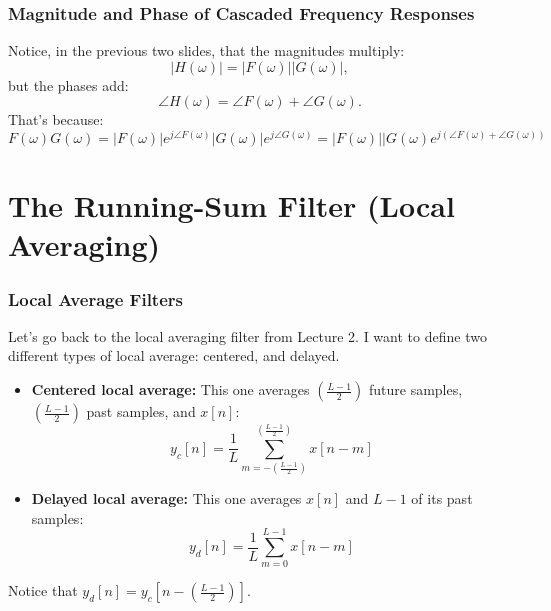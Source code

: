 \documentclass{beamer}
\begin{document}
\begin{frame}
  \frametitle{Magnitude and Phase of Cascaded Frequency Responses}

  Notice, in the previous two slides, that the magnitudes multiply:
  \[
  |H(\omega)|=|F(\omega)||G(\omega)|,
  \]
  but the phases add:
  \[
  \angle H(\omega) = \angle F(\omega)+\angle G(\omega).
  \]
  That's because:
  \[
  F(\omega)G(\omega)=|F(\omega)|e^{j\angle F(\omega)}|G(\omega)|e^{j\angle G(\omega)}
  =|F(\omega)||G(\omega) e^{j\left(\angle F(\omega)+\angle G(\omega)\right)}
  \]
\end{frame}

\section[Sum]{The Running-Sum Filter (Local Averaging)}
\setcounter{subsection}{1}

\begin{frame}
  \frametitle{Local Average Filters}

  Let's go back to the local averaging filter from Lecture 2. I want to define two 
  different types of local average: centered, and delayed.
  \begin{itemize}
  \item {\bf Centered local average:} This one averages
    $\left(\frac{L-1}{2}\right)$ future samples,
    $\left(\frac{L-1}{2}\right)$ past samples, and $x[n]$:
    \[
    y_c[n] = \frac{1}{L}\sum_{m=-\left(\frac{L-1}{2}\right)}^{\left(\frac{L-1}{2}\right)} x[n-m]
    \]
  \item {\bf Delayed local average:} This one averages $x[n]$ and $L-1$ of its
    past samples:
    \[
    y_d[n] = \frac{1}{L}\sum_{m=0}^{L-1} x[n-m]
    \]
  \end{itemize}
  Notice that $y_d[n] = y_c\left[n-\left(\frac{L-1}{2}\right)\right]$.
\end{frame}
\end{document}
